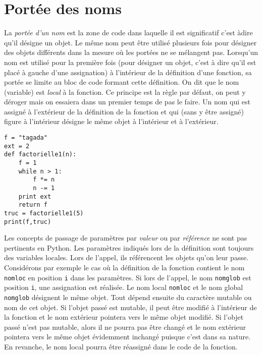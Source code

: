 \section{Portée des noms}
La \emph{portée d'un nom} est la zone de code dans laquelle il est significatif c'est àdire qu'il désigne un objet. Le même nom peut être utilisé plusieurs fois pour désigner des objets différents dans la mesure où les portées ne se mélangent pas.\newline
Lorsqu'un nom est utilisé pour la première fois (pour désigner un objet, c'est à dire qu'il est placé à gauche d'une assignation) à l'intérieur de la définition d'une fonction, sa portée se limite au bloc de code formant cette définition. On dit que le nom (variable) est \emph{local} à la fonction. Ce principe est la règle par défaut, on peut y déroger mais on essaiera dans un premier temps de pas le faire.\newline
Un nom qui est assigné à l'extérieur de la définition de la fonction et qui (sans y être assigné) figure à l'intérieur désigne le même objet à l'intérieur et à l'extérieur.
\begin{verbatim}
f = "tagada"
ext = 2
def factorielle1(n):
    f = 1
    while n > 1:
        f *= n
        n -= 1
    print ext
    return f 
truc = factorielle1(5)
print(f,truc) 
\end{verbatim}
Les concepts de passage de paramètres par \emph{valeur} ou par \emph{référence} ne sont pas pertinents en Python.\newline
Les paramètres indiqués lors de la définition sont toujours des variables locales. Lors de l'appel, ils référencent les objets qu'on leur passe.\newline
Considérons par exemple le cas où la définition de la fonction contient le nom \texttt{nomloc} en position \texttt{i} dans les paramètres. Si lors de l'appel, le nom \texttt{nomglob} est position \texttt{i}, une assignation est réalisée. Le nom local \texttt{nomloc} et le nom global \texttt{nomglob} désignent le même objet.\newline
Tout dépend ensuite du caractère mutable ou nom de cet objet.\newline
Si l'objet passé est mutable, il peut être modifié à l'intérieur de la fonction et le nom extérieur pointera vers le même objet modifié. Si l'objet passé n'est pas mutable, alors il ne pourra pas être changé et le nom extérieur pointera vers le même objet évidemment inchangé puisque c'est dans sa nature. En revanche, le nom local pourra être réassigné dans le code de la fonction. 

